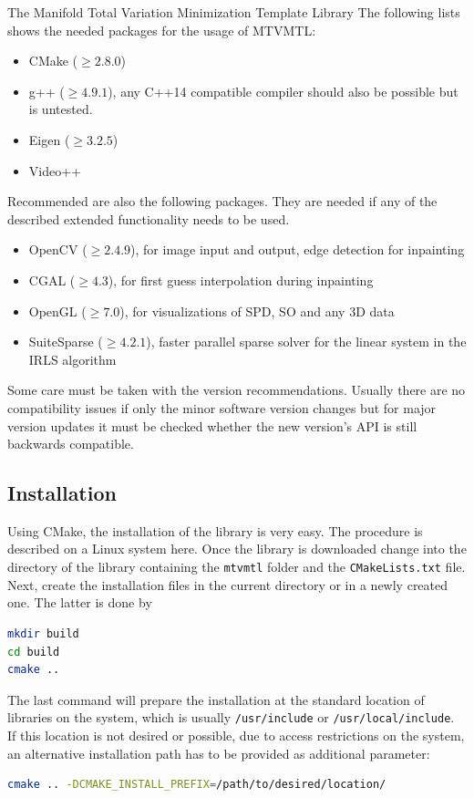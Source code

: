 \begin{chapter}{The Manifold Total Variation Minimization Template Library}
The following lists shows the needed packages for the usage of MTVMTL:
\begin{itemize}
    \item CMake ($\geq 2.8.0$)
    \item g++ ($\geq 4.9.1$), any C++14 compatible compiler should also be possible but is untested.
    \item Eigen ($\geq 3.2.5$)
    \item Video++
\end{itemize}

Recommended are also the following packages. They are needed if any of the described extended functionality needs to be used.
\begin{itemize}
    \item OpenCV ($\geq 2.4.9$), for image input and output, edge detection for inpainting
    \item CGAL ($\geq 4.3$), for first guess interpolation during inpainting
    \item OpenGL ($\geq 7.0$), for visualizations of SPD, SO and any 3D data
    \item SuiteSparse ($\geq 4.2.1$), faster parallel sparse solver for the linear system in the IRLS algorithm
\end{itemize}
Some care must be taken with the version recommendations. Usually there are no compatibility issues if only the minor software version changes but for major version updates it must
be checked whether the new version's API is still backwards compatible.


\subsection{Installation} %
\label{sub:Installation}
Using CMake, the installation of the library is very easy. The procedure is described on a Linux system here.
Once the library is downloaded change into the directory of the library containing 
the \texttt{mtvmtl} folder and the \texttt{CMakeLists.txt} file.
Next, create the installation files in the current directory or in a newly created one. The latter is
done by
\begin{lstlisting}[language=bash]
mkdir build
cd build
cmake ..
\end{lstlisting}
The last command will prepare the installation at the standard location of libraries on the system, which is usually
\texttt{/usr/include} or \texttt{/usr/local/include}. If this location is not desired or possible, due to
access restrictions on the system, an alternative installation path has to be provided as additional parameter:
\begin{lstlisting}[language=bash]
cmake .. -DCMAKE_INSTALL_PREFIX=/path/to/desired/location/
\end{lstlisting}


\end{chapter}

